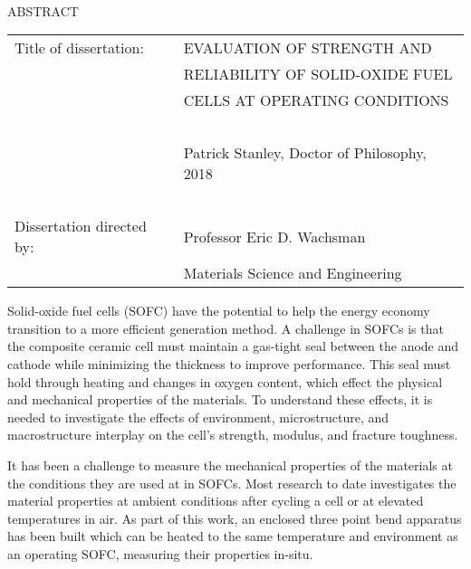 

\hbox{\ }

\renewcommand{\baselinestretch}{1}
\small \normalsize

\begin{center}
\large{{ABSTRACT}}

\vspace{3em}

\end{center}
\hspace{-.15in}
\begin{tabular}{ll}
Title of dissertation:    & {\large  EVALUATION OF STRENGTH AND  }\\
&				      {\large  RELIABILITY OF SOLID-OXIDE FUEL } \\
&				      {\large  CELLS AT OPERATING CONDITIONS} \\
\ \\
&                          {\large  Patrick Stanley, Doctor of Philosophy, 2018} \\
\ \\
Dissertation directed by: & {\large  Professor Eric D. Wachsman} \\
&  				{\large	 Materials Science and Engineering } \\
\end{tabular}

\vspace{3em}

\renewcommand{\baselinestretch}{2}
\large \normalsize

Solid-oxide fuel cells (SOFC) have the potential to help the energy economy transition to a more efficient generation method.
A challenge in SOFCs is that the composite ceramic cell must maintain a gas-tight seal between the anode and cathode while minimizing the thickness to improve performance.
This seal must hold through heating and changes in oxygen content, which effect the physical and mechanical properties of the materials.
To understand these effects, it is needed to investigate the effects of environment, microstructure, and macrostructure interplay on the cell’s strength, modulus, and fracture toughness.

It has been a challenge to measure the mechanical properties of the materials at the conditions they are used at in SOFCs.
Most research to date investigates the material properties at ambient conditions after cycling a cell or at elevated temperatures in air.
As part of this work, an enclosed three point bend apparatus has been built which can be heated to the same temperature and environment as an operating SOFC, measuring their properties in-situ.

